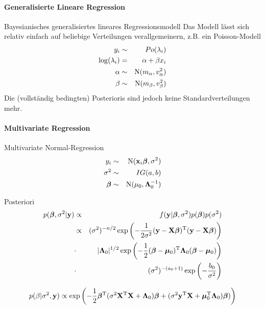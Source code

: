 \documentclass[german]{beamer}
\numberwithin{Bsp}{section}
\numberwithin{Def}{section}
\numberwithin{Stz}{section}
\begin{document}
\paragraph{Generalisierte Lineare Regression}
\begin{frame}{Bayesianisches generalisiertes lineares Regressionsmodell}
Das Modell lässt sich relativ einfach auf beliebige Verteilungen verallgemeinern, z.B. ein Poisson-Modell
\begin{eqnarray*}
y_i &\sim& Po(\lambda_i)\\
\log(\lambda_i) &=& \alpha+\beta x_i\\
\alpha&\sim&{\rm N}(m_\alpha,v_\alpha^2)\\
\beta &\sim&{\rm N}(m_\beta,v_\beta^2)
\end{eqnarray*}
Die (vollständig bedingten) Posterioris sind jedoch keine Standardverteilungen mehr.
\end{frame}

\paragraph{Multivariate Regression}
\begin{frame}{Multivariate Normal-Regression}
\begin{eqnarray}
y_i &\sim & {\rm N}(\mathbf{x}_i\boldsymbol\beta,\sigma^2)\\
\sigma^2&\sim&IG(a,b)\\
{\boldsymbol\beta} &\sim&{\rm N}(\mu_0,\boldsymbol\Lambda^{-1}_0)
\end{eqnarray}
\end{frame}
\begin{frame}{Posteriori}
\begin{eqnarray*}
p(\boldsymbol\beta,\sigma^{2}|\mathbf{y}) &\propto& f(\mathbf{y}|\boldsymbol\beta,\sigma^{2})p(\boldsymbol\beta)p(\sigma^{2})\\
&\propto&  (\sigma^{2})^{-n/2} \exp\left(-\frac{1}{2{\sigma}^{2}}(\mathbf{y}- \mathbf{X} \boldsymbol\beta)^{\rm T}(\mathbf{y}- \mathbf{X} \boldsymbol\beta)\right)\\
&\cdot&     |\boldsymbol\Lambda_0|^{1/2} \exp\left(-\frac{1}{2}(\boldsymbol\beta -\boldsymbol\mu_0)^{\rm T} \boldsymbol\Lambda_0 (\boldsymbol\beta - \boldsymbol\mu_0)\right)\\
&\cdot&  (\sigma^2)^{-(a_0+1)} \exp\left(-\frac{b_0}{{\sigma}^{2}}\right)
\end{eqnarray*}

$$ 
p(\beta|\sigma^2,\mathbf{y}) \propto \exp\left(-\frac{1}{2}\boldsymbol\beta^{\rm T}({\sigma}^{2}\mathbf{X}^{\rm T}
\mathbf{X}+\boldsymbol\Lambda_0)\boldsymbol\beta + (\sigma^2\mathbf{y}^{\rm T}\mathbf{X}+\boldsymbol
\mu_0^{\rm T}\boldsymbol \Lambda_0)\boldsymbol \beta)\right) 
$$
\end{frame}
\end{document}
